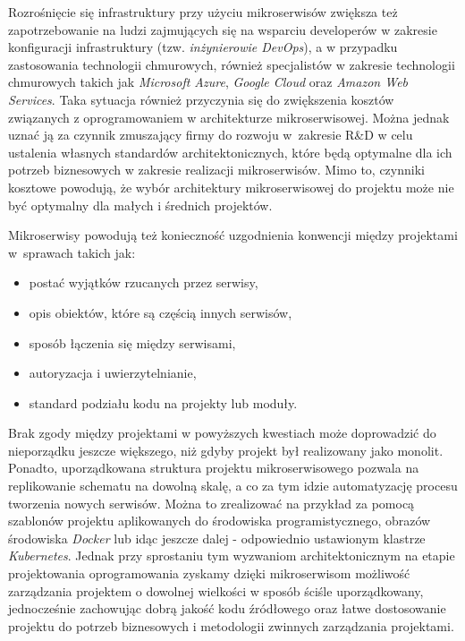 \documentclass{SGGW-thesis}
\begin{document}
  Rozrośnięcie się infrastruktury przy użyciu mikroserwisów zwiększa też zapotrzebowanie na ludzi zajmujących się na wsparciu developerów w zakresie konfiguracji infrastruktury (tzw. \textit{inżynierowie DevOps}), a w przypadku zastosowania technologii chmurowych, również specjalistów w zakresie technologii chmurowych takich jak \textit{Microsoft Azure}, \textit{Google Cloud} oraz \textit{Amazon Web Services}. Taka sytuacja również przyczynia się do zwiększenia kosztów związanych z oprogramowaniem w architekturze mikroserwisowej. Można jednak uznać ją za czynnik zmuszający firmy do rozwoju w~zakresie R\&D w celu ustalenia własnych standardów architektonicznych, które będą optymalne dla ich potrzeb biznesowych w zakresie realizacji mikroserwisów. Mimo to, czynniki kosztowe powodują, że wybór architektury mikroserwisowej do projektu może nie być optymalny dla małych i średnich projektów.

  Mikroserwisy powodują też konieczność uzgodnienia konwencji między projektami w~sprawach takich jak:

  \begin{itemize}
    \item postać wyjątków rzucanych przez serwisy,
    \item opis obiektów, które są częścią innych serwisów,
    \item sposób łączenia się między serwisami,
    \item autoryzacja i uwierzytelnianie,
    \item standard podziału kodu na projekty lub moduły.
  \end{itemize}
  Brak zgody między projektami w powyższych kwestiach może doprowadzić do nieporządku jeszcze większego, niż gdyby projekt był realizowany jako monolit. Ponadto, uporządkowana struktura projektu mikroserwisowego pozwala na replikowanie schematu na dowolną skalę, a co za tym idzie automatyzację procesu tworzenia nowych serwisów. Można to zrealizować na przykład za pomocą szablonów projektu aplikowanych do środowiska programistycznego, obrazów środowiska \textit{Docker} lub idąc jeszcze dalej - odpowiednio ustawionym klastrze \textit{Kubernetes}. Jednak przy sprostaniu tym wyzwaniom architektonicznym na etapie projektowania oprogramowania zyskamy dzięki mikroserwisom możliwość zarządzania projektem o dowolnej wielkości w sposób ściśle uporządkowany, jednocześnie zachowując dobrą jakość kodu źródłowego oraz łatwe dostosowanie projektu do potrzeb biznesowych i metodologii zwinnych zarządzania projektami.
\end{document}
